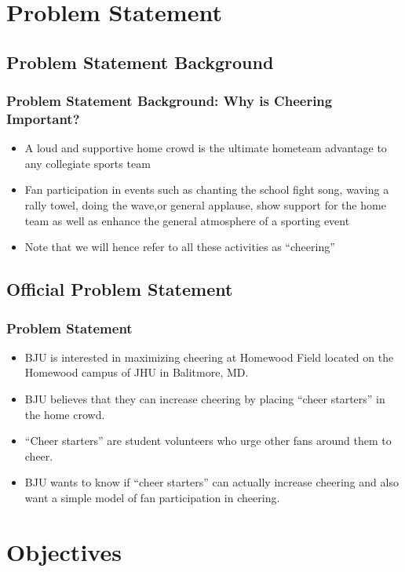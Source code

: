 \documentclass[compress,handout,10pt]{beamer}
\let\olditem\item
\renewcommand{\item}{\setlength{\itemsep}{0.5\baselineskip}\olditem}
\begin{document}
\section{Problem Statement}

\subsection{Problem Statement Background}

\begin{frame}
	\frametitle{Problem Statement Background: Why is Cheering Important?}
		\begin{itemize}
			\item A loud and supportive home crowd is the ultimate hometeam advantage to any collegiate sports team 
			\item Fan participation in events such as chanting the school fight song, waving a rally towel, doing the wave,or general applause, show support for the home team as well as enhance the general atmosphere of a sporting event 
			\item Note that we will hence refer to all these activities as ``cheering''
		\end{itemize}
\end{frame}

\subsection{Official Problem Statement}

\begin{frame}
	\frametitle{Problem Statement}
			\begin {itemize}
				\item BJU is interested in maximizing cheering at Homewood Field located on the Homewood campus of JHU in Balitmore, MD. 
				\item BJU believes that they can increase cheering by placing ``cheer starters'' in the home crowd.
				\item ``Cheer starters'' are student volunteers who urge other fans around them to cheer. 
				\item BJU wants to know if ``cheer starters'' can actually increase cheering and also want a simple model of fan participation in cheering.
			\end {itemize}
\end{frame}

\section {Objectives}
\end{document}
